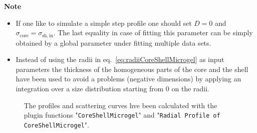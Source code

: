 \noindent
\textbf{Note}
\begin{itemize}
  \item If one like to simulate a simple step profile one should set $D=0$ and
        $\sigma_\mathrm{core}=\sigma_\mathrm{sh,in}$. The last equality
        in case of fitting this parameter can be simply obtained by a global parameter
        under fitting multiple data sets.
  \item Instead of using the radii in eq.\ \ref{eq:radiiCoreShellMicrogel} as input parameters the thickness
        of the homogeneous parts of the core and the shell have been used to avoid a problems
        (negative dimensions) by applying an integration over a size distribution starting from 0 on the radii.
\end{itemize}
\begin{figure}[htb]
\begin{center}
\hfill
{}
\end{center}
\caption{The profiles and scattering curves hve been calculated with the plugin functions
"\texttt{CoreShellMicrogel}" and "\texttt{Radial Profile of CoreShellMicrogel}".}
\label{fig:profile:Example_CoreShellMicrogel}
\end{figure}

